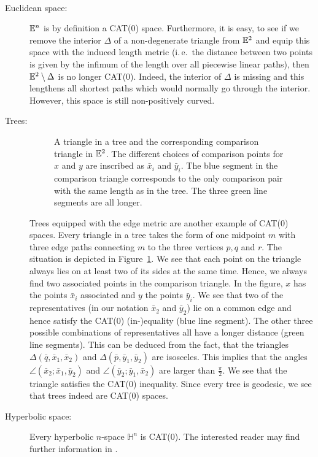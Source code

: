 \begin{bsp}~
  \begin{description}
  \item[Euclidean space:] \(\mathbb{E}^n\) is by definition a CAT(0) space. Furthermore, it is easy, to see if we remove the interior \(\Delta\) of a non-degenerate triangle from \(\mathbb{E}^2\) and equip this space with the induced length metric (i.\,e.\ the distance between two points is given by the infimum of the length over all piecewise linear paths), then \(\mathbb{E}^2 \setminus \Delta\) is no longer CAT(0). Indeed, the interior of \(\Delta\) is missing and this lengthens all shortest paths which would normally go through the interior. However, this space is still non-positively curved.
  \item[Trees:]
    \begin{figure}[htbp]
      \centering
      
      \caption{A triangle in a tree and the corresponding comparison triangle in \(\mathbb{E}^2\). The different choices of comparison points for \(x\) and \(y\) are inscribed as \(\bar x_i\) and \(\bar y_i\). The blue segment in the comparison triangle corresponds to the only comparison pair with the same length as in the tree. The three green line segments are all longer.}
      \label{fig:cat-tree}
    \end{figure}
    Trees equipped with the edge metric are another example of CAT(0) spaces. Every triangle in a tree takes the form of one midpoint \(m\) with three edge paths connecting \(m\) to the three vertices \(p,q\) and \(r\). The situation is depicted in Figure~\ref{fig:cat-tree}. We see that each point on the triangle always lies on at least two of its sides at the same time. Hence, we always find two associated points in the comparison triangle. In the figure, \(x\) has the points \(\bar x_i\) associated and \(y\) the points \(\bar y_i\). We see that two of the representatives (in our notation \(\bar x_2\) and \(\bar y_2\)) lie on a common edge and hence satisfy the CAT(0) (in-)equality (blue line segment). The other three possible combinations of representatives all have a longer distance (green line segments). This can be deduced from the fact, that the triangles \(\Delta(\bar q, \bar x_1, \bar x_2)\) and \(\Delta(\bar p, \bar y_1, \bar y_2)\) are isosceles. This implies that the angles \(\angle(\bar x_2; \bar x_1, \bar y_2)\) and \(\angle(\bar y_2; \bar y_1, \bar x_2)\) are larger than \(\frac{\pi}{2}\). We see that the triangle satisfies the CAT(0) inequality. Since every tree is geodesic, we see that trees indeed are CAT(0) spaces.
  \item[Hyperbolic space:] Every hyperbolic \(n\)-space \(\mathbb{H}^n\) is CAT(0). The interested reader may find further information in \textcite[Section~II.1]{MR1744486}.
  \end{description}
\end{bsp}



